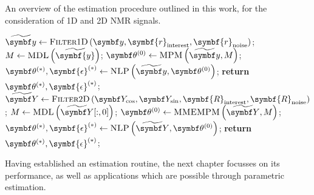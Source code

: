 \begin{algorithm}
    \begin{algorithmic}[1]
        \caption[
            An overview of the estimation procedure outlined in this work.
        ]{
            An overview of the estimation procedure outlined in this work, for
            the consideration of \ac{1D} and \ac{2D} \ac{NMR} signals.
        }
        \label{alg:1d-2d-summary}
            \State $\widetilde{\by} \gets \textsc{Filter}1\textsc{D}\left(
                \by,
                \symbf{r}_{\text{interest}},
                \symbf{r}_{\text{noise}}
                \right)
            $;
                \State $M \gets \textsc{MDL}\left(\widetilde{\symbf{y}}\right)$;
            \EndIf
            \State $\bthzero \gets \textsc{MPM}\left(\widetilde{\by}, M\right)$;
            \State $\bthstar, \symbf{\epsilon}^{(*)} \gets \textsc{NLP}\left(\widetilde{\by}, \bthzero\right)$;
            \State \textbf{return} $\bthstar, \symbf{\epsilon}^{(*)}$;
        \EndProcedure
        \Statex
            \State $\widetilde{\bY} \gets \textsc{Filter}2\textsc{D}\left(
                \bY_{\cos},
                \bY_{\sin},
                \symbf{R}_{\text{interest}},
                \symbf{R}_{\text{noise}}
                \right)
            $;
                \State $M \gets \textsc{MDL}\left(\widetilde{\bY}[:, 0]\right)$;
            \EndIf
            \State $\bthzero \gets \textsc{MMEMPM}\left(\widetilde{\bY}, M\right)$;
            \State $\bthstar, \symbf{\epsilon}^{(*)} \gets \textsc{NLP}\left(\widetilde{\bY}, \bthzero\right)$;
            \State \textbf{return} $\bthstar, \symbf{\epsilon}^{(*)}$;
        \EndProcedure
    \end{algorithmic}
\end{algorithm}

Having established an estimation routine, the next chapter focusses on its
performance, as well as applications which are possible through parametric
estimation.
